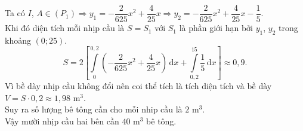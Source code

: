 \begin{ex}
{{
		}\noindent
		Ta có $I$, $A\in (P_1)\Rightarrow y_1=-\dfrac{2}{625}x^2+\dfrac{4}{25}x\Rightarrow y_2=-\dfrac{2}{625}x^2+\dfrac{4}{25}x-\dfrac{1}{5}$.\\
		Khi đó diện tích mỗi nhịp cầu là $S=S_1$ với $S_1$ là phần giới hạn bởi $y_1$, $y_2$ trong khoảng $(0;25)$.
		$$S=2\left[\int\limits_0^{0{,}2}\left(-\dfrac{2}{625}x^2+\dfrac{4}{25}x\right)\mathrm{\,d}x+\int\limits_{0{,}2}^{15}\dfrac{1}{5}\mathrm{\,d}x\right]\approx 0{,}9.$$
		Vì bề dày nhịp cầu không đổi nên coi thể tích là tích diện tích và bề dày $V=S\cdot 0{,}2\approx 1{,}98$ m$^3$.\\
		Suy ra số lượng bê tông cần cho mỗi nhip cầu là $2$ m$^3$.\\ Vậy mười nhịp cầu hai bên cần $40$ m$^3$ bê tông.
	}
\end{ex}

